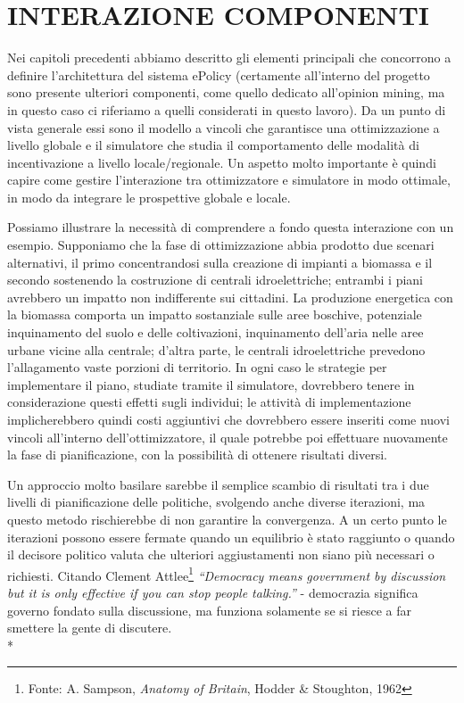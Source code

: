 \documentclass[12pt,a4paper,openright,twoside]{report}
\begin{document}
\chapter{\nohyphens{INTERAZIONE COMPONENTI}}
Nei capitoli precedenti abbiamo descritto gli elementi principali che concorrono a definire l'architettura del sistema ePolicy (certamente all'interno del progetto sono presente ulteriori componenti, come quello dedicato all'opinion mining, ma in questo caso ci riferiamo a quelli considerati in questo lavoro). Da un punto di vista generale essi sono il modello a vincoli che garantisce una ottimizzazione a livello globale e il simulatore che studia il comportamento delle modalità di incentivazione a livello locale/regionale. Un aspetto molto importante è quindi capire come gestire l'interazione tra ottimizzatore e simulatore in modo ottimale, in modo da integrare le prospettive globale e locale.

Possiamo illustrare la necessità di comprendere a fondo questa interazione con un esempio. Supponiamo che la fase di ottimizzazione abbia prodotto due scenari alternativi, il primo concentrandosi sulla creazione di impianti a biomassa e il secondo sostenendo la costruzione di centrali idroelettriche; entrambi i piani avrebbero un impatto non indifferente sui cittadini. La produzione energetica con la biomassa comporta un impatto sostanziale sulle aree boschive, potenziale inquinamento del suolo e delle coltivazioni, inquinamento dell'aria nelle aree urbane vicine alla centrale; d'altra parte, le centrali idroelettriche prevedono l'allagamento vaste porzioni di territorio. In ogni caso le strategie per implementare il piano, studiate tramite il simulatore, dovrebbero tenere in considerazione questi effetti sugli individui; le attività di implementazione implicherebbero quindi costi aggiuntivi che dovrebbero essere inseriti come nuovi vincoli all'interno dell'ottimizzatore, il quale potrebbe poi effettuare nuovamente la fase di pianificazione, con la possibilità di ottenere risultati diversi. 

Un approccio molto basilare sarebbe il semplice scambio di risultati tra i due livelli di pianificazione delle politiche, svolgendo anche diverse iterazioni, ma questo metodo rischierebbe di non garantire la convergenza. A un certo punto le iterazioni possono essere fermate quando un equilibrio è stato raggiunto o quando il decisore politico valuta che ulteriori aggiustamenti non siano più necessari o richiesti. Citando Clement Attlee\footnote{Fonte: A. Sampson, \emph{Anatomy of Britain}, Hodder \& Stoughton, 1962} \emph{``Democracy means government by discussion but it is only effective if you can stop people talking.''} - democrazia significa governo fondato sulla discussione, ma funziona solamente se si riesce a far smettere la gente di discutere.
\\*
\end{document}
